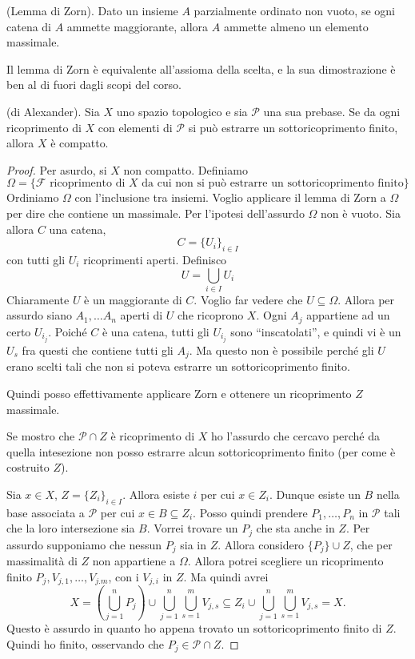\begin{thm}
    (Lemma di Zorn). Dato un insieme $A$ parzialmente ordinato non vuoto, se ogni catena di $A$ ammette maggiorante, allora $A$ ammette almeno un elemento massimale.
\end{thm}
\begin{oss}
    Il lemma di Zorn \`e equivalente all'assioma della scelta, e la sua dimostrazione \`e ben al di fuori dagli scopi del corso.
\end{oss}
\begin{thm}
    (di Alexander). Sia $X$ uno spazio topologico e sia $\mathcal{P}$ una sua prebase. Se da ogni ricoprimento di $X$ con elementi di $\mathcal{P}$ si pu\`o estrarre un sottoricoprimento finito, allora $X$ \`e compatto.
\end{thm}
\begin{proof}
    Per asurdo, si $X$ non compatto. Definiamo
    \[
        \Omega = \{\mathcal{F} \text{ ricoprimento di $X$ da cui non si pu\`o estrarre un sottoricoprimento finito}\}
    \]
    Ordiniamo $\Omega$ con l'inclusione tra insiemi. Voglio applicare il lemma di Zorn a $\Omega$ per dire che contiene un massimale. Per l'ipotesi dell'assurdo $\Omega$ non \`e vuoto. Sia allora $C$ una catena,
    \[
        C = \{U_i\}_{i\in I}
    \]
    con tutti gli $U_i$ ricoprimenti aperti. Definisco
    \[
        U = \bigcup_{i\in I}U_i
    \]
    Chiaramente $U$ \`e un maggiorante di $C$. Voglio far vedere che $U \subseteq\Omega$. Allora per assurdo siano $A_1, \dots A_n$ aperti di $U$  che ricoprono $X$. Ogni $A_j$ appartiene ad un certo $U_{i_j}$. Poich\'e $C$ \`e una catena, tutti gli $U_{i_j}$ sono ``inscatolati'', e quindi vi \`e un $U_s$ fra questi che contiene tutti gli $A_j$. Ma questo non \`e possibile perch\'e gli $U$ erano scelti tali che non si poteva estrarre un sottoricoprimento finito.

    Quindi posso effettivamente applicare Zorn e ottenere un ricoprimento $Z$ massimale.

    Se mostro che $\mathcal{P}\cap Z$ \`e ricoprimento di $X$ ho l'assurdo che cercavo perch\'e da quella intesezione non posso estrarre alcun sottoricoprimento finito (per come \`e costruito $Z$).

    Sia $x\in X$, $Z = \{Z_i\}_{i\in I}$. Allora esiste $i$ per cui $x\in Z_i$. Dunque esiste un $B$ nella base associata a $\mathcal{P}$ per cui $x\in B\subseteq Z_i$. Posso quindi prendere $P_1, \dots, P_n$ in $\mathcal{P}$ tali che la loro intersezione sia $B$. Vorrei trovare un $P_j$ che sta anche in $Z$. Per assurdo supponiamo che nessun $P_j$ sia in $Z$. Allora considero ${\{P_j \} \cup Z}$, che per massimalit\`a di $Z$ non appartiene a $\Omega$.
    Allora potrei scegliere un ricoprimento finito $P_j, V_{j,1}, \dots, V_{j.m}$, con i $V_{j,i}$ in $Z$. Ma quindi avrei
    \[
        X = \left(\bigcup_{j=1}^nP_j\right)\cup \bigcup_{j=1}^n\bigcup_{s=1}^m V_{j,s} \subseteq Z_i \cup \bigcup_{j=1}^n\bigcup_{s=1}^m V_{j,s} = X.
    \]
    Questo \`e assurdo in quanto ho appena trovato un sottoricoprimento finito di $Z$.
    Quindi ho finito, osservando che $P_j\in \mathcal{P}\cap Z$.
\end{proof}

